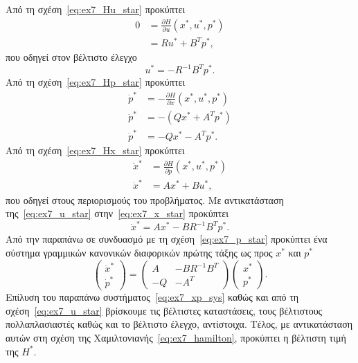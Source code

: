 \begin{solution}
    Από τη σχέση~\eqref{eq:ex7_Hu_star} προκύπτει
    \begin{align*}
        0 &= \frac{\partial H}{\partial u} (x^*, u^*, p^*) \\
        &= Ru^* + B^{T}p^*,
    \end{align*}
    που οδηγεί στον βέλτιστο έλεγχο
    \begin{equation}\label{eq:ex7_u_star}
        u^* = -R^{-1}B^{T}p^*.
    \end{equation}
    Από τη σχέση~\eqref{eq:ex7_Hp_star} προκύπτει
    \begin{align}\label{eq:ex7_p_star}
        \dot{p}^* &= -\frac{\partial H}{\partial x} (x^*, u^*, p^*) \nonumber \\
        \dot{p}^* &= -\left(Qx^* + A^{T}p^*\right) \nonumber \\
        \dot{p}^* &= -Qx^* - A^{T}p^*.
    \end{align}
    Από τη σχέση~\eqref{eq:ex7_Hx_star} προκύπτει
    \begin{align}\label{eq:ex7_x_star}
        \dot{x}^* &= \frac{\partial H}{\partial p} (x^*, u^*, p^*) \nonumber \\
        \dot{x}^* &= Ax^* + Bu^*,
    \end{align}
    που οδηγεί στους περιορισμούς του προβλήματος. Με αντικατάσταση
    της~\eqref{eq:ex7_u_star} στην~\eqref{eq:ex7_x_star} προκύπτει
    \[
        \dot{x}^* = Ax^* - BR^{-1}B^{T}p^*.
    \]
    Από την παραπάνω σε συνδυασμό με τη σχέση~\eqref{eq:ex7_p_star} προκύπτει
    ένα σύστημα γραμμικών κανονικών διαφορικών πρώτης τάξης ως προς
    \( x^* \) και \( p^* \)
    \begin{equation}\label{eq:ex7_xp_sys}
        \begin{pmatrix}
            \dot{x}^* \\
            \dot{p}^*
        \end{pmatrix} =
        \begin{pmatrix}
            A & -BR^{-1}B^{T} \\
            -Q & -A^{T}
        \end{pmatrix}
        \begin{pmatrix}
            x^* \\
            p^*
        \end{pmatrix}.
    \end{equation}
    Επίλυση του παραπάνω συστήματος~\eqref{eq:ex7_xp_sys} καθώς και από τη
    σχέση~\eqref{eq:ex7_u_star} βρίσκουμε τις βέλτιστες καταστάσεις, τους
    βέλτιστους πολλαπλασιαστές  καθώς και το βέλτιστο έλεγχο,
    αντίστοιχα. Τέλος, με αντικατάσταση αυτών στη σχέση της
    Χαμιλτονιανής~\eqref{eq:ex7_hamilton}, προκύπτει η βέλτιστη τιμή της \( H^*
    \).


\end{solution}
